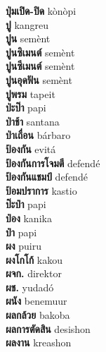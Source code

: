 \textbf{ ปุ่มเปิด-ปิด  } kònòpi \\
\textbf{ ปู  } kangreu \\
\textbf{ ปูน  } semènt \\
\textbf{ ปูนซิเมนต์  } semènt \\
\textbf{ ปูนซีเมนต์  } semènt \\
\textbf{ ปูนอุดฟัน  } semènt \\
\textbf{ ปูพรม  } tapeit \\
\textbf{ ป่ะป๊า  } papi \\
\textbf{ ป่าช้า  } santana \\
\textbf{ ป่าเถื่อน  } bárbaro \\
\textbf{ ป้องกัน  } evitá \\
\textbf{ ป้องกันการโจมตี  } defendé \\
\textbf{ ป้องกันแชมป์  } defendé \\
\textbf{ ป้อมปราการ  } kastio \\
\textbf{ ป๊ะป๋า  } papi \\
\textbf{ ป๋อง  } kanika \\
\textbf{ ป๋า  } papi \\
\textbf{ ผง  } puiru \\
\textbf{ ผงโกโก้  } kakou \\
\textbf{ ผจก.  } direktor \\
\textbf{ ผช.  } yudadó \\
\textbf{ ผนัง  } benemuur \\
\textbf{ ผลกล้วย  } bakoba \\
\textbf{ ผลการตัดสิน  } desishon \\
\textbf{ ผลงาน  } kreashon \\
